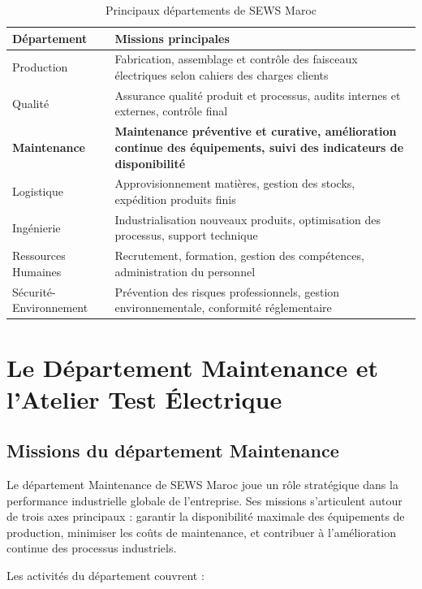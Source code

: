 \begin{table}[htbp]
\centering
\caption{Principaux départements de SEWS Maroc}
\label{tab:departements_sews}
\small
\begin{tabular}{@{}p{3.5cm}p{9cm}@{}}
\toprule
\textbf{Département} & \textbf{Missions principales} \\
\midrule
Production & Fabrication, assemblage et contrôle des faisceaux électriques selon cahiers des charges clients \\
\rowcolor{gray!10}
Qualité & Assurance qualité produit et processus, audits internes et externes, contrôle final \\
\textbf{Maintenance} & \textbf{Maintenance préventive et curative, amélioration continue des équipements, suivi des indicateurs de disponibilité} \\
\rowcolor{gray!10}
Logistique & Approvisionnement matières, gestion des stocks, expédition produits finis \\
Ingénierie & Industrialisation nouveaux produits, optimisation des processus, support technique \\
\rowcolor{gray!10}
Ressources Humaines & Recrutement, formation, gestion des compétences, administration du personnel \\
Sécurité-Environnement & Prévention des risques professionnels, gestion environnementale, conformité réglementaire \\
\bottomrule
\end{tabular}
\end{table}

\section{Le Département Maintenance et l'Atelier Test Électrique}

\subsection{Missions du département Maintenance}

Le département Maintenance de SEWS Maroc joue un rôle stratégique dans la performance industrielle globale de l'entreprise. Ses missions s'articulent autour de trois axes principaux : garantir la disponibilité maximale des équipements de production, minimiser les coûts de maintenance, et contribuer à l'amélioration continue des processus industriels.

Les activités du département couvrent :

